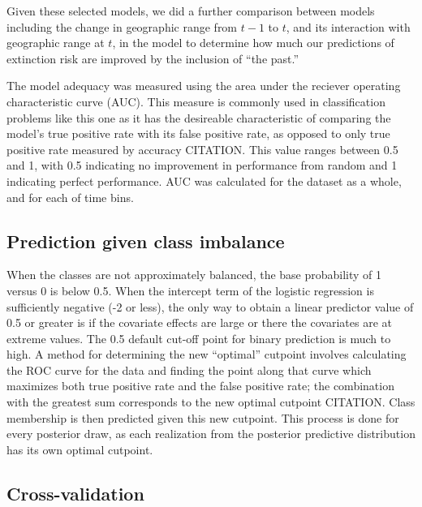 \documentclass[12pt,letterpaper]{article}
\begin{document}
Given these selected models, we did a further comparison between models including the change in geographic range from \(t - 1\) to \(t\), and its interaction with geographic range at \(t\), in the model to determine how much our predictions of extinction risk are improved by the inclusion of ``the past.''

The model adequacy was measured using the area under the reciever operating characteristic curve (AUC). This measure is commonly used in classification problems like this one as it has the desireable characteristic of comparing the model's true positive rate with its false positive rate, as opposed to only true positive rate measured by accuracy CITATION. This value ranges between 0.5 and 1, with 0.5 indicating no improvement in performance from random and 1 indicating perfect performance. AUC was calculated for the dataset as a whole, and for each of time bins.


\subsection{Prediction given class imbalance}

When the classes are not approximately balanced, the base probability of 1 versus 0 is below 0.5. When the intercept term of the logistic regression is sufficiently negative (-2 or less), the only way to obtain a linear predictor value of 0.5 or greater is if the covariate effects are large or there the covariates are at extreme values. The 0.5 default cut-off point for binary prediction is much to high. A method for determining the new ``optimal'' cutpoint involves calculating the ROC curve for the data and finding the point along that curve which maximizes both true positive rate and the false positive rate; the combination with the greatest sum corresponds to the new optimal cutpoint CITATION. Class membership is then predicted given this new cutpoint. This process is done for every posterior draw, as each realization from the posterior predictive distribution has its own optimal cutpoint.


\subsection{Cross-validation}
\end{document}
